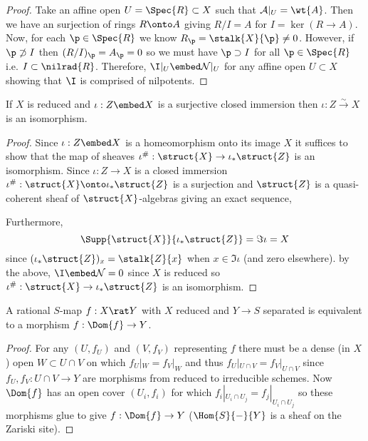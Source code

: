 \documentclass[12pt]{article}
\begin{document}
\begin{proof}
Take an affine open $U = \Spec{R} \subset X$ such that $\mathcal{A} |_{U} = \wt{A}$. Then we have an surjection of rings $R \onto A$ giving $R/I = A$ for $I = \ker{(R \to A)}$. Now, for each $\p \in \Spec{R}$ we know $R_\p = \stalk{X}{\p} \neq 0$. However, if $\p \not\supset I$ then $(R/I)_\p = A_\p = 0$ so we must have $\p \supset I$ for all $\p \in \Spec{R}$ i.e. $I \subset \nilrad{R}$. Therefore, $\I |_U \embed \Nil|_U$ for any affine open $U \subset X$ showing that $\I$ is comprised of nilpotents. 
\end{proof}

\begin{corollary}
If $X$ is reduced and $\iota : Z \embed X$ is a surjective closed immersion then $\iota : Z \xrightarrow{\sim} X$ is an isomorphism. 
\end{corollary}

\begin{proof}
Since $\iota: Z \embed X$ is a homeomorphism onto its image $X$ it suffices to show that the map of sheaves $\iota^\# : \struct{X} \to \iota_* \struct{Z}$ is an isomorphism. Since $\iota : Z \to X$ is a closed immersion $\iota^\# : \struct{X} \onto \iota_* \struct{Z}$ is a surjection and $\struct{Z}$ is a quasi-coherent sheaf of $\struct{X}$-algebras giving an exact sequence,
\begin{center}
\end{center} Furthermore, 
\[ \Supp{\struct{X}}{\iota_* \struct{Z}} = \Im{\iota} = X \]
since $(\iota_* \struct{Z})_x = \stalk{Z}{x}$ when $x \in \Im{\iota}$ (and zero elsewhere). by the above, $\I \embed \Nil = 0$ since $X$ is reduced so $\iota^\# : \struct{X} \to \iota_* \struct{Z}$ is an isomorphism.  
\end{proof}

\begin{lemma}
A rational $S$-map $f : X \rat Y$ with $X$ reduced and $Y \to S$ separated is equivalent to a morphism $f : \Dom{f} \to Y$. 
\end{lemma}

\begin{proof}
For any $(U, f_U)$ and $(V, f_V)$ representing $f$ there must be a dense (in $X$) open $W \subset U \cap V$ on which $f_U|_W = f_V|_W$ and thus $f_U |_{U \cap V} = f_V |_{U \cap V}$ since $f_U, f_V : U \cap V \to Y$ are morphisms from reduced to irreducible schemes. Now $\Dom{f}$ has an open cover $(U_i, f_i)$ for which $f_i |_{U_i \cap U_j} = f_j |_{U_i \cap U_j}$ so these morphisms glue to give $f : \Dom{f} \to Y$ ($\Hom{S}{-}{Y}$ is a sheaf on the Zariski site).  
\end{proof}
\end{document}
